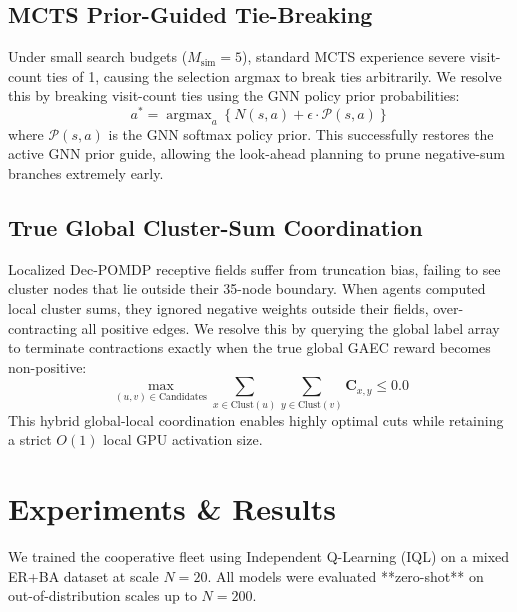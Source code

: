 \documentclass[10pt]{article}
\begin{document}
\subsection{MCTS Prior-Guided Tie-Breaking}
Under small search budgets ($M_{\text{sim}} = 5$), standard MCTS experience severe visit-count ties of 1, causing the selection argmax to break ties arbitrarily. We resolve this by breaking visit-count ties using the GNN policy prior probabilities:
\begin{equation}
a^* = \operatorname{argmax}_{a} \left\{ N(s, a) + \epsilon \cdot \mathcal{P}(s, a) \right\}
\end{equation}
where $\mathcal{P}(s, a)$ is the GNN softmax policy prior. This successfully restores the active GNN prior guide, allowing the look-ahead planning to prune negative-sum branches extremely early.

\subsection{True Global Cluster-Sum Coordination}
Localized Dec-POMDP receptive fields suffer from truncation bias, failing to see cluster nodes that lie outside their 35-node boundary. When agents computed local cluster sums, they ignored negative weights outside their fields, over-contracting all positive edges. We resolve this by querying the global label array to terminate contractions exactly when the true global GAEC reward becomes non-positive:
\begin{equation}
\max_{(u, v) \in \text{Candidates}} \sum_{x \in \text{Clust}(u)} \sum_{y \in \text{Clust}(v)} \mathbf{C}_{x, y} \le 0.0
\end{equation}
This hybrid global-local coordination enables highly optimal cuts while retaining a strict $O(1)$ local GPU activation size.

\section{Experiments \& Results}
We trained the cooperative fleet using Independent Q-Learning (IQL) on a mixed ER+BA dataset at scale $N=20$. All models were evaluated **zero-shot** on out-of-distribution scales up to $N=200$.
\end{document}
